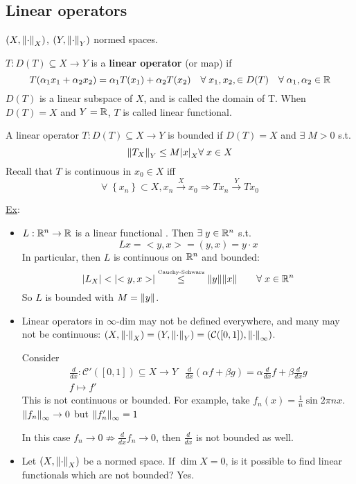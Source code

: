 \subsection*{Linear operators}
\((X, \norm{\cdot}_X)\), \((Y, \norm{\cdot}_Y)\) normed spaces.
\begin{definition}
    \(T : D(T) \subseteq X \to Y\) is a \textbf{linear operator} (or map) if 
    \[
        T(\alpha_1 x_1 + \alpha_2 x_2) = \alpha_1 T(x_1) + \alpha_2 T(x_2) \quad \forall \; x_1, x_2, \in D(T) \quad \forall \; \alpha_1, \alpha_2 \in \mathbb{R}
    \]
    \(D(T)\) is a linear subspace of \(X\), and is called the domain of T. When \(D(T) = X\) and \(Y = \mathbb{R}\), \(T\) is called linear functional.
\end{definition}
\begin{definition}
    A linear operator \(T : D(T) \subseteq X \to Y\) is bounded if \(D(T) = X\) and \(\exists \; M >0\) s.t. 
    \[
        \norm{T_X}_Y \leq M \abs{x}_X \forall \; x \in X
    \]
    Recall that \(T\) is continuous in \(x_0 \in X\) iff 
    \[
        \forall \; \left\{ x_n \right\} \subset X, x_n \overset{X}{\to} x_0 \Rightarrow Tx_n \overset{Y}{\to} Tx_0
    \]
\end{definition}
\underline{Ex}:
\begin{itemize}
    \item \(L: \mathbb{R}^n \to \mathbb{R}\)  is a linear functional . Then \(\exists \; y \in \mathbb{R}^n\) s.t. 
    \[
        Lx = <y, x> = (y, x) = y \cdot x
    \]
    In particular, then \(L\) is continuous on \(\mathbb{R}^n\) and bounded:
    \[
        \abs{L_X} < \abs{<y,x>} \overset{\text{\tiny{Cauchy-Schwarz}}}{\leq} \norm{y} \norm{x} \qquad \forall\; x \in \mathbb{R}^n
    \]
    So \(L\) is bounded with \(M=\norm{y}\).

    \item Linear operators in \(\infty\)-dim may not be defined everywhere, and many may not be continuous:
    \((X, \norm{\cdot}_X) = (Y, \norm{\cdot}_Y) = (\mathcal{C}([0, 1]), \norm{\cdot}_\infty)\).
    
    Consider 
    \[
        \begin{array}{cc}
            \frac{d}{dx}: \mathcal{C}'([0,1]) \subseteq X \to Y & \frac{d}{dx}(\alpha f + \beta g) = \alpha \frac{d}{dx}f + \beta \frac{d}{dx} g \\
            f \mapsto f'
        \end{array}
    \]
    This is not continuous or bounded. For example, take \(f_n(x) = \frac{1}{n} \sin{2\pi n x}\). \(\norm{f_n}_\infty \to 0\) but \(\norm{f_n'}_\infty =1\)

    In this case \(f_n \to 0 \nRightarrow \frac{d}{dx} f_n \to 0\), then \(\frac{d}{dx} \) is not bounded as well.
    \item Let \((X, \norm{\cdot}_X)\) be a normed space. If \(\dim X = 0\), is it possible to find linear functionals which are not bounded? Yes.
\end{itemize}
